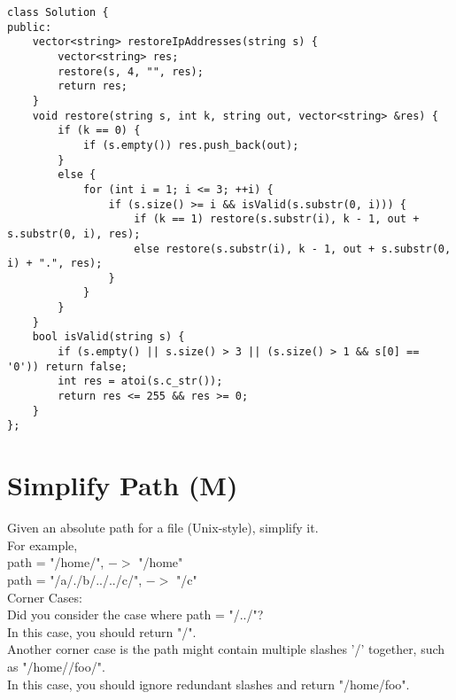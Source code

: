 \begin{lstlisting}
class Solution {
public:
    vector<string> restoreIpAddresses(string s) {
        vector<string> res;
        restore(s, 4, "", res);
        return res;
    }
    void restore(string s, int k, string out, vector<string> &res) {
        if (k == 0) {
            if (s.empty()) res.push_back(out);
        }
        else {
            for (int i = 1; i <= 3; ++i) {
                if (s.size() >= i && isValid(s.substr(0, i))) {
                    if (k == 1) restore(s.substr(i), k - 1, out + s.substr(0, i), res);
                    else restore(s.substr(i), k - 1, out + s.substr(0, i) + ".", res);
                }
            }
        }
    }
    bool isValid(string s) {
        if (s.empty() || s.size() > 3 || (s.size() > 1 && s[0] == '0')) return false;
        int res = atoi(s.c_str());
        return res <= 255 && res >= 0;
    }
};
\end{lstlisting}


\section{Simplify Path (M)}
Given an absolute path for a file (Unix-style), simplify it.\\

For example,\\
path = "/home/", $->$ "/home"\\
path = "/a/./b/../../c/", $->$ "/c"\\

Corner Cases:\\
    Did you consider the case where path = "/../"?\\
    In this case, you should return "/".\\
    Another corner case is the path might contain multiple slashes '/' together, such as "/home//foo/".\\
    In this case, you should ignore redundant slashes and return "/home/foo".\\
    
